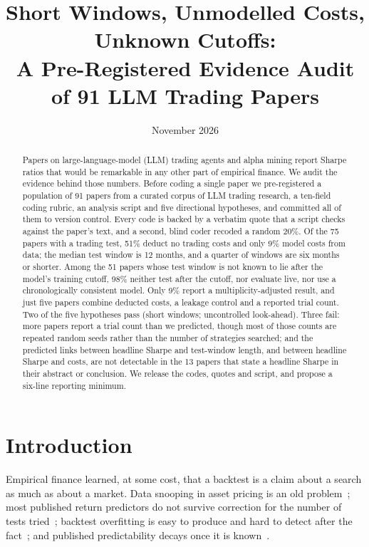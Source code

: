 \documentclass[11pt]{article}
\title{Short Windows, Unmodelled Costs, Unknown Cutoffs:\\
A Pre-Registered Evidence Audit of 91 LLM Trading Papers}
\author{\paperauthor}
\date{November 2026}
\begin{document}
\maketitle

\begin{abstract}
Papers on large-language-model (LLM) trading agents and alpha mining report
Sharpe ratios that would be remarkable in any other part of empirical finance.
We audit the evidence behind those numbers. Before coding a single paper we
pre-registered a population of 91 papers from a curated corpus of LLM
trading research, a ten-field coding rubric, an analysis script and five
directional hypotheses, and committed all of them to version control. Every
code is backed by a verbatim quote that a script checks against the paper's
text, and a second, blind coder recoded a random 20\%. Of the 75 papers with a
trading test, 51\% deduct no trading costs and only 9\% model costs from data;
the median test window is 12 months, and a quarter of windows are six months or
shorter. Among the 51 papers whose test window is not known to lie after the
model's training cutoff, 98\% neither test after the cutoff, nor evaluate live,
nor use a chronologically consistent model. Only 9\% report a
multiplicity-adjusted result, and just five papers combine deducted costs,
a leakage control and a reported trial count. Two of the five hypotheses
pass (short windows; uncontrolled look-ahead). Three fail: more papers report a
trial count than we predicted, though most of those counts are repeated random
seeds rather than the number of strategies searched; and the predicted links
between headline Sharpe and test-window length, and between headline Sharpe
and costs, are not detectable in the 13 papers that state a headline Sharpe in
their abstract or conclusion. We release the codes, quotes and script, and
propose a six-line reporting minimum.
\end{abstract}

\section{Introduction}

Empirical finance learned, at some cost, that a backtest is a claim about a
search as much as about a market. Data snooping in asset pricing is an old
problem~\cite{lo1990data,white2000reality,hansen2005test}; most published
return predictors do not survive correction for the number of tests
tried~\cite{harvey2016cross,hou2020replicating}; backtest overfitting is easy to
produce and hard to detect after the
fact~\cite{bailey2014deflated,bailey2017probability}; and published
predictability decays once it is known~\cite{mclean2016does}.
\end{document}
